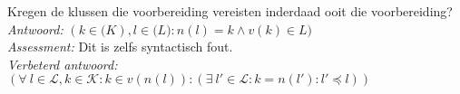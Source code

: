 
\item Kregen de klussen die voorbereiding vereisten inderdaad ooit die voorbereiding? \\


\emph{Antwoord:} $( k \in \mathcal(K), l \in \mathcal(L) : n(l) = k \land v(k) \in L )$ \\
\emph{Assessment:} Dit is zelfs syntactisch fout. \\

\emph{Verbeterd antwoord:} $(\forall ~ l \in \mathcal{L}, k \in \mathcal{K} : k \in v(n(l)) : (\exists ~ l' \in \mathcal{L} : k = n(l') : l' \preccurlyeq l) )$ \\
